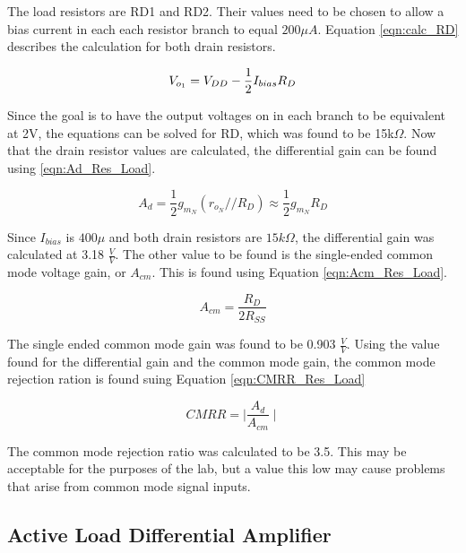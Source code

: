 The load resistors are RD1 and RD2. Their values need to be chosen to allow a bias current in each each resistor branch to equal $200\mu A$. Equation \ref{eqn:calc_RD} describes the calculation for both drain resistors.

\begin{equation}
    V_{o_1} = V_{DD} - \frac{1}{2}I_{bias}R_D\newline
     \label{eqn:calc_RD}
\end{equation}

Since the goal is to have the output voltages on in each branch to be equivalent at 2V, the equations can be solved for RD, which was found to be 15k$\Omega$. Now that the drain resistor values are calculated, the differential gain can be found using \ref{eqn:Ad_Res_Load}.


\begin{equation}
    A_d = \frac{1}{2}g_{m_N}(r_{o_N}//R_D) \approx \frac{1}{2} g_{m_N}R_D
     \label{eqn:Ad_Res_Load}
\end{equation}

Since $I_{bias} $ is $400\mu$ and both drain resistors are $15 k\Omega$, the differential gain was calculated at 3.18 $\frac{V}{V}$. The other value to be found is the single-ended common mode voltage gain, or $A_{cm}$. This is found using Equation \ref{eqn:Acm_Res_Load}.

\begin{equation}
    A_{cm} = \frac{R_D}{2R_{SS}}
    \label{eqn:Acm_Res_Load}
\end{equation}

The single ended common mode gain was found to be 0.903 $\frac{V}{V}$. Using the value found for the differential gain and the common mode gain, the common mode rejection ration is found suing Equation \ref{eqn:CMRR_Res_Load}

\begin{equation}
    CMRR = \mid\frac{A_d}{A_{cm}}\mid
    \label{eqn:CMRR_Res_Load}
\end{equation}

The common mode rejection ratio was calculated to be 3.5. This may be acceptable for the purposes of the lab, but a value this low may cause problems that arise from common mode signal inputs.

\subsection{Active Load Differential Amplifier}

